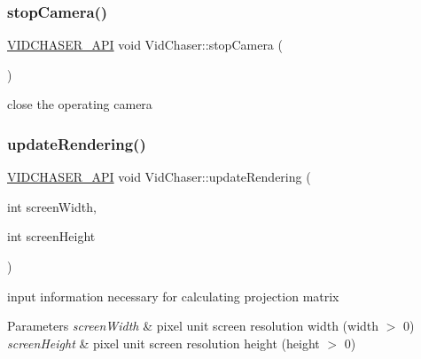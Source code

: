 \subsubsection{\texorpdfstring{stop\+Camera()}{stopCamera()}}
{\footnotesize\ttfamily \hyperlink{_vid_chaser_a_p_i_8h_abe868bb94e22f611aece5087695f9ef3}{V\+I\+D\+C\+H\+A\+S\+E\+R\+\_\+\+A\+PI} void Vid\+Chaser\+::stop\+Camera (\begin{DoxyParamCaption}{ }\end{DoxyParamCaption})}



close the operating camera 

\mbox{\label{namespace_vid_chaser_afbfe1bf77862004fd5da9c95194cc506}} 
\subsubsection{\texorpdfstring{update\+Rendering()}{updateRendering()}}
{\footnotesize\ttfamily \hyperlink{_vid_chaser_a_p_i_8h_abe868bb94e22f611aece5087695f9ef3}{V\+I\+D\+C\+H\+A\+S\+E\+R\+\_\+\+A\+PI} void Vid\+Chaser\+::update\+Rendering (\begin{DoxyParamCaption}\item[{int}]{screen\+Width,  }\item[{int}]{screen\+Height }\end{DoxyParamCaption})}



input information necessary for calculating projection matrix 


\begin{DoxyParams}{Parameters}
{\em screen\+Width} & pixel unit screen resolution width (width $>$ 0) \\
\hline
{\em screen\+Height} & pixel unit screen resolution height (height $>$ 0) \\
\hline
\end{DoxyParams}
